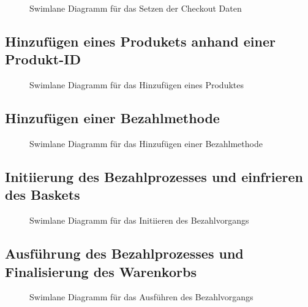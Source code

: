 \begin{figure}[htbp]
	\centering
	
	\caption{Swimlane Diagramm für das Setzen der Checkout Daten}
	\label{fig:SL-Checkoutdata}
\end{figure}

\subsection{Hinzufügen eines Produkets anhand einer Produkt-ID}

\begin{figure}[htbp]
	\centering
	
	\caption{Swimlane Diagramm für das Hinzufügen eines Produktes }
	\label{fig:SL-AddProduct}
\end{figure}

\subsection{Hinzufügen einer Bezahlmethode}

\begin{figure}[htbp]
	\centering
	
	\caption{Swimlane Diagramm für das Hinzufügen einer Bezahlmethode}
	\label{fig:SL-PutBezahlmethode}
\end{figure}

\subsection{Initiierung des Bezahlprozesses und einfrieren des Baskets}

\begin{figure}[htbp]
	\centering
	
	\caption{Swimlane Diagramm für das Initiieren des Bezahlvorgangs }
	\label{fig:SL-InitPayment}
\end{figure}

\subsection{Ausführung des Bezahlprozesses und Finalisierung des Warenkorbs}

\begin{figure}[htbp]
	\centering
	
	\caption{Swimlane Diagramm für das Ausführen des Bezahlvorgangs }
	\label{fig:SL-ExecPayment}
\end{figure}



